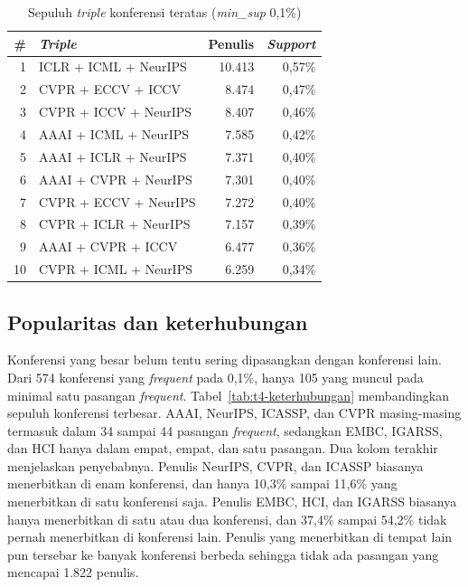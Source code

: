 \begin{table}[ht]
\caption{Sepuluh \textit{triple} konferensi teratas (\textit{min\_sup} 0,1\%)}
\label{tab:t4-triple}
\small
\begin{tabular}{@{}rlrr@{}}
\toprule
\textbf{\#} & \textbf{\textit{Triple}} & \textbf{Penulis} & \textbf{\textit{Support}} \\
\midrule
1 & ICLR + ICML + NeurIPS & 10.413 & 0,57\% \\
2 & CVPR + ECCV + ICCV & 8.474 & 0,47\% \\
3 & CVPR + ICCV + NeurIPS & 8.407 & 0,46\% \\
4 & AAAI + ICML + NeurIPS & 7.585 & 0,42\% \\
5 & AAAI + ICLR + NeurIPS & 7.371 & 0,40\% \\
6 & AAAI + CVPR + NeurIPS & 7.301 & 0,40\% \\
7 & CVPR + ECCV + NeurIPS & 7.272 & 0,40\% \\
8 & CVPR + ICLR + NeurIPS & 7.157 & 0,39\% \\
9 & AAAI + CVPR + ICCV & 6.477 & 0,36\% \\
10 & CVPR + ICML + NeurIPS & 6.259 & 0,34\% \\
\bottomrule
\end{tabular}
\end{table}

\subsection{Popularitas dan keterhubungan}
\label{sec:hasil-t4-fp-keterhubungan}
Konferensi yang besar belum tentu sering dipasangkan dengan konferensi lain. Dari 574 konferensi yang \textit{frequent} pada 0,1\%, hanya 105 yang muncul pada minimal satu pasangan \textit{frequent}. Tabel~\ref{tab:t4-keterhubungan} membandingkan sepuluh konferensi terbesar. AAAI, NeurIPS, ICASSP, dan CVPR masing-masing termasuk dalam 34 sampai 44 pasangan \textit{frequent}, sedangkan EMBC, IGARSS, dan HCI hanya dalam empat, empat, dan satu pasangan. Dua kolom terakhir menjelaskan penyebabnya. Penulis NeurIPS, CVPR, dan ICASSP biasanya menerbitkan di enam konferensi, dan hanya 10,3\% sampai 11,6\% yang menerbitkan di satu konferensi saja. Penulis EMBC, HCI, dan IGARSS biasanya hanya menerbitkan di satu atau dua konferensi, dan 37,4\% sampai 54,2\% tidak pernah menerbitkan di konferensi lain. Penulis yang menerbitkan di tempat lain pun tersebar ke banyak konferensi berbeda sehingga tidak ada pasangan yang mencapai 1.822 penulis.

